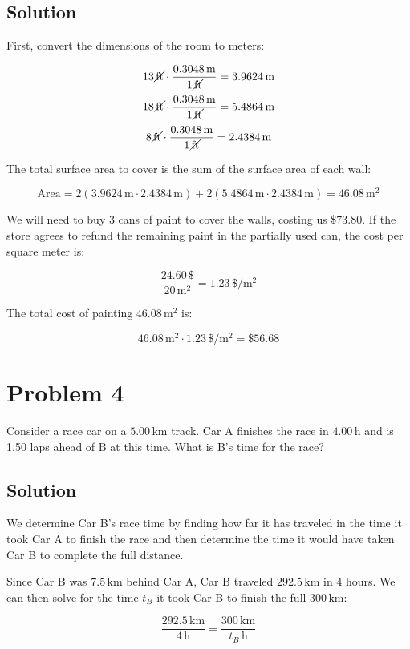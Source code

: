 \documentclass{article}
\newcommand{\kilo}{\text{k}}
\newcommand{\meter}{\text{m}}
\newcommand{\foot}{\text{ft}}
\begin{document}
\subsection*{Solution}
First, convert the dimensions of the room to meters:

\[
13 \, \cancel{\foot} \cdot \frac{0.3048 \, \meter}{1 \, \cancel{\foot}} = 3.9624 \, \meter
\]
\[
18 \, \cancel{\foot} \cdot \frac{0.3048 \, \meter}{1 \, \cancel{\foot}} = 5.4864 \, \meter
\]
\[
8 \, \cancel{\foot} \cdot \frac{0.3048 \, \meter}{1 \, \cancel{\foot}} = 2.4384 \, \meter
\]

The total surface area to cover is the sum of the surface area of each wall:

\[
\text{Area} = 2\left( 3.9624 \, \meter \cdot 2.4384 \, \meter \right) + 2 \left( 5.4864 \, \meter \cdot 2.4384 \, \meter \right) = 46.08 \, \meter^2
\]

We will need to buy 3 cans of paint to cover the walls, costing us \$73.80. If the store agrees to refund the remaining paint in the partially used can, the cost per square meter is:

\[
\frac{24.60 \, \text{\$}}{20 \, \meter^2} = 1.23 \, \text{\$}/\meter^2
\]

The total cost of painting \(46.08 \, \meter^2\) is:

\[
46.08 \, \meter^2 \cdot 1.23 \, \text{\$}/\meter^2 = \$56.68
\]

\section*{Problem 4}
Consider a race car on a \(5.00 \, \si{\kilo\meter}\) track. Car A finishes the race in \(4.00 \, \si{\hour}\) and is 1.50 laps ahead of B at this time. What is B's time for the race?

\subsection*{Solution}
We determine Car B's race time by finding how far it has traveled in the time it took Car A to finish the race and then determine the time it would have taken Car B to complete the full distance.

Since Car B was \(7.5 \, \si{\kilo\meter}\) behind Car A, Car B traveled \(292.5 \, \si{\kilo\meter}\) in 4 hours. We can then solve for the time \( t_B \) it took Car B to finish the full \(300 \, \si{\kilo\meter}\):

\[
\frac{292.5 \, \si{\kilo\meter}}{4 \, \si{\hour}} = \frac{300 \, \si{\kilo\meter}}{t_B \, \si{\hour}}
\]
\end{document}

